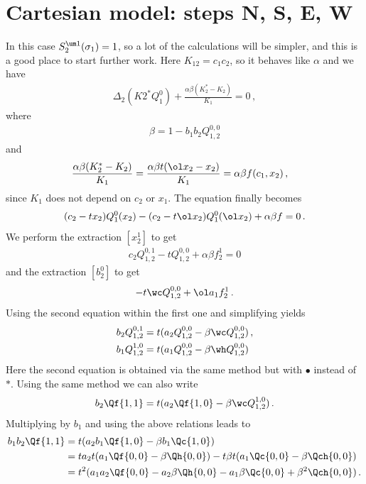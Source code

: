 \section{Cartesian model: steps N, S, E, W}
In this case $S_2^{\um 1}(\sigma_1) = 1$, so a lot of the calculations will be simpler, and this is a good place to start further work. Here $K_{12} = c_1c_2$, so it behaves like $\alpha$ and we have
\begin{align}
	\Delta_2(K2^\ast Q_1^0) + \frac{\alpha\beta(K_2^\ast-K_2)}{K_1}=0\,,
\end{align}
where
\begin{align}
	\beta =  1-b_1b_2 Q_{1,2}^{0,0}
\end{align}
and
\begin{align}
	\frac{\alpha\beta(K_2^\ast -K_2)}{K_1}  &= \frac{\alpha\beta t (\ol x_2 - x_2)}{K_1} = \alpha\beta f(c_1,x_2)\,,
\end{align}
since $K_1$ does not depend on $c_2$ or $x_1$. The equation finally becomes
\begin{align}
	(c_2-tx_2)Q_1^0(x_2) - (c_2-t\ol x_2)Q_1^0(\ol x_2) + \alpha\beta f = 0\,.
\end{align}
We perform the extraction $[x_2^1]$ to get
\begin{align}
	c_2Q_{1,2}^{0,1}-t Q_{1,2}^{0,0} + \alpha\beta f_2^1 = 0
\end{align}
and the extraction $[b_2^0]$ to get
\begin{align}
	- t \wc Q_{1,2}^{0,0} +  \ol a_1f_2^1\,.
\end{align}
Using the second equation within the first one and simplifying yields
\begin{align}
	b_2 Q_{1,2}^{0,1} &= t(a_2 Q_{1,2}^{0,0} - \beta \wc Q_{1,2}^{0,0})\,,\\
	b_1 Q_{1,2}^{1,0} &= t(a_1 Q_{1,2}^{0,0} - \beta \wh Q_{1,2}^{0,0})
\end{align}
Here the second equation is obtained via the same method but with $\bullet$ instead of $\ast$. Using the same method we can also write
\begin{align}
	b_2 \Qf{1,1} = t(a_2 \Qf{1,0}-\beta \wc Q_{1,2}^{1,0})\,.
\end{align}
Multiplying by $b_1$ and using the above relations leads to
\begin{align}
\begin{split}
	b_1b_2 \Qf{1,1} &= t(a_2b_1\Qf{1,0}-\beta b_1 \Qc{1,0})\\
			      &=t a_2t(a_1\Qf{0,0}-\beta \Qh{0,0})-t\beta t(a_1\Qc{0,0}-\beta\Qch{0,0})\\	
			      &=t^2(a_1a_2\Qf{0,0}-a_2\beta\Qh{0,0}-a_1\beta\Qc{0,0}+\beta^2\Qch{0,0})\,.
\end{split}
\end{align}
